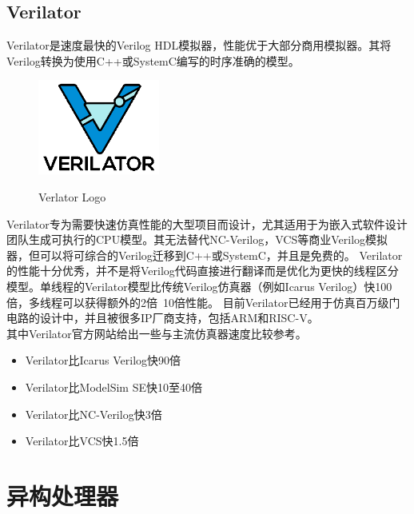     \subsection{Verilator}
Verilator是速度最快的Verilog HDL模拟器，性能优于大部分商用模拟器。其将Verilog转换为使用C++或SystemC编写的时序准确的模型。
\begin{figure}%
    \includegraphics[width=4cm]{../pdf/verilator.png}\
    \caption{Verlator Logo}
\end{figure}
    Verilator专为需要快速仿真性能的大型项目而设计，尤其适用于为嵌入式软件设计团队生成可执行的CPU模型。其无法替代NC-Verilog，VCS等商业Verilog模拟器，但可以将可综合的Verilog迁移到C++或SystemC，并且是免费的。
Verilator的性能十分优秀，并不是将Verilog代码直接进行翻译而是优化为更快的线程区分模型。单线程的Verilator模型比传统Verilog仿真器（例如Icarus Verilog）快100倍，多线程可以获得额外的2倍~10倍性能。
目前Verilator已经用于仿真百万级门电路的设计中，并且被很多IP厂商支持，包括ARM和RISC-V。\\
其中Verilator官方网站给出一些与主流仿真器速度比较参考。
        \begin{itemize}[topsep = 0 pt]
            \setlength{\topsep}{0pt}
            \setlength{\itemsep}{0pt}
            \setlength{\parsep}{0pt}
            \setlength{\parskip}{0pt}
            \setlength{\partopsep}{0pt}
            \item Verilator比Icarus Verilog快90倍
            \item Verilator比ModelSim SE快10至40倍
            \item Verilator比NC-Verilog快3倍
            \item Verilator比VCS快1.5倍
        \end{itemize}


\section{异构处理器}
